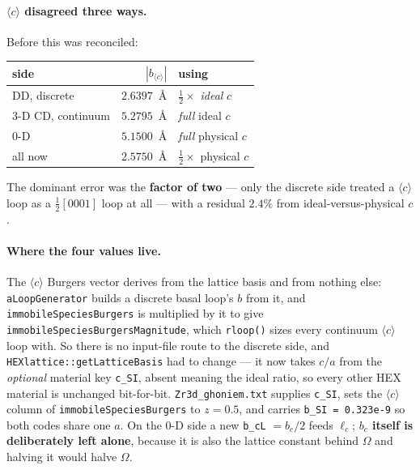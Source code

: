 \documentclass[11pt]{article}
\newcommand{\cloop}{\ensuremath{\langle c\rangle}}
\newcommand{\code}[1]{\texttt{\small #1}}
\begin{document}
\paragraph{\cloop{} disagreed three ways.} Before this was reconciled:

\begin{center}
\begin{tabular}{@{}lrl@{}}
\toprule
side & $|b_{\cloop{}}|$ & using \\
\midrule
DD, discrete       & $2.6397$~\AA{} & $\frac12\times$ \emph{ideal} $c$ \\
3-D CD, continuum  & $5.2795$~\AA{} & \emph{full} ideal $c$ \\
0-D                & $5.1500$~\AA{} & \emph{full} physical $c$ \\
all now            & $\mathbf{2.5750}$~\AA{} & $\frac12\times$ physical $c$ \\
\bottomrule
\end{tabular}
\end{center}

The dominant error was the \textbf{factor of two} --- only the discrete side
treated a \cloop{} loop as a $\frac12[0001]$ loop at all --- with a residual
$2.4\%$ from ideal-versus-physical $c$.

\paragraph{Where the four values live.} The \cloop{} Burgers vector derives from
the lattice basis and from nothing else: \code{aLoopGenerator} builds a discrete
basal loop's $b$ from it, and \code{immobileSpeciesBurgers} is multiplied by it
to give \code{immobileSpeciesBurgersMagnitude}, which \code{rloop()} sizes every
continuum \cloop{} loop with. So there is no input-file route to the discrete
side, and \code{HEXlattice::getLatticeBasis} had to change --- it now takes
$c/a$ from the \emph{optional} material key \code{c\_SI}, absent meaning the
ideal ratio, so every other HEX material is unchanged bit-for-bit.
\code{Zr3d\_ghoniem.txt} supplies \code{c\_SI}, sets the \cloop{} column of
\code{immobileSpeciesBurgers} to $z = 0.5$, and carries
\code{b\_SI = 0.323e-9} so both codes share one $a$. On the 0-D side a new
\code{b\_cL} $= b_c/2$ feeds $\ell_c$; \textbf{$b_c$ itself is deliberately left
alone}, because it is also the lattice constant behind $\Omega$ and halving it
would halve $\Omega$.
\end{document}
